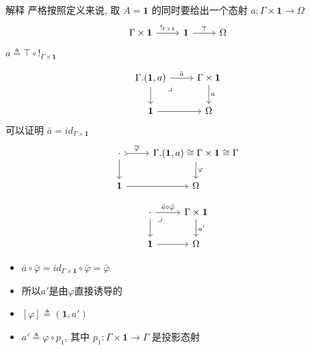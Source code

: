 \documentclass[aspectratio=169,xcolor=dvipsnames]{beamer}
\newcommand\bfone{\mathbf{1}}
\begin{document}
\begin{frame}{解释}
严格按照定义来说, 取 $A=\bfone$ 的同时要给出一个态射 $a : \Gamma \times \bfone \to \Omega$
\[
  \begin{tikzcd}
    \Gamma\times\bfone \arrow[r,"!_{\Gamma\times\bfone}"] & \bfone \arrow[r,"\top"] & \Omega
  \end{tikzcd}
\]
$a \triangleq \top\circ !_{\Gamma\times\bfone}$

\[
\begin{tikzcd}
\Gamma.(\bfone,a) \arrow[r,"{\bar{a}}"] \arrow[d] \arrow[dr,phantom,"\lrcorner" very near start] & \Gamma\times\bfone \arrow[d,"a"] \\
\bfone \arrow[r] & \Omega
\end{tikzcd}
\]
可以证明 $\bar{a} = id_{\Gamma\times\bfone}$
\[
  \begin{tikzcd}
    \cdot \arrow[r,tail,"\overline{\varphi}"] \arrow[d] & \Gamma.(\bfone,a) \cong\Gamma\times\bfone\cong\Gamma \arrow[d,"{\varphi}"] \\
    \bfone \arrow[r] & \Omega
  \end{tikzcd}
\]
\end{frame}

\begin{frame}
\[
\begin{tikzcd}
\cdot \arrow[r,"{\bar{a}\circ\bar{\varphi}}"] \arrow[d] \arrow[dr,phantom,"\lrcorner" very near start] & \Gamma\times\bfone \arrow[d,"a'"] \\
\bfone \arrow[r] & \Omega
\end{tikzcd}
\]
\begin{itemize}
\item $\bar{a}\circ\bar{\varphi} = id_{\Gamma\times\bfone}\circ \bar{\varphi} = \bar{\varphi}$
\item 所以$a'$是由$\varphi$直接诱导的
\item $[\varphi] \triangleq (\bfone, a')$
\item $a' \triangleq \varphi\circ p_1$, 其中 $p_1 : \Gamma\times\bfone \to \Gamma$ 是投影态射
\end{itemize}
\end{frame}
\end{document}
